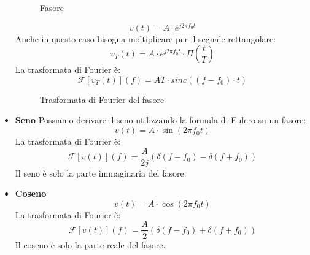 \documentclass[a4paper]{article}
\begin{document}
\begin{itemize}
\begin{figure}[H]
      \caption{Fasore}
    \end{figure}
    \[
      v(t) = A \cdot e^{j 2 \pi f_0 t}
    \] 
    Anche in questo caso bisogna moltiplicare per il segnale rettangolare:
    \[
      v_T(t) = A \cdot e^{j 2 \pi f_0 t} \cdot \Pi\left(\frac{t}{T}\right)
    \] 
    La trasformata di Fourier è:
    \[
      \mathcal{F}\left[ v_T(t) \right](f) = AT \cdot sinc((f - f_0) \cdot t)
    \] 
    \begin{figure}[H]
      \centering
      \caption{Trasformata di Fourier del fasore}
    \end{figure}
  \item \textbf{Seno}
    \vspace{1em}
    \noindent
    Possiamo derivare il seno utilizzando la formula di Eulero su un fasore:
    \[
    v(t) = A \cdot \sin(2 \pi f_0 t)
    \] 
    La trasformata di Fourier è:
    \[
      \mathcal{F}\left[ v(t) \right](f) = \frac{A}{2j} \left( \delta(f - f_0) - \delta(f + f_0) \right)
    \]
    Il seno è solo la parte immaginaria del fasore.
  \item \textbf{Coseno}
    \vspace{1em}
    \noindent
    \[
    v(t) = A \cdot \cos(2 \pi f_0 t)
    \] 
    La trasformata di Fourier è:
    \[
      \mathcal{F}\left[ v(t) \right](f) = \frac{A}{2} \left( \delta(f - f_0) + \delta(f + f_0) \right)
    \]
    Il coseno è solo la parte reale del fasore.
\end{itemize}
\end{document}
